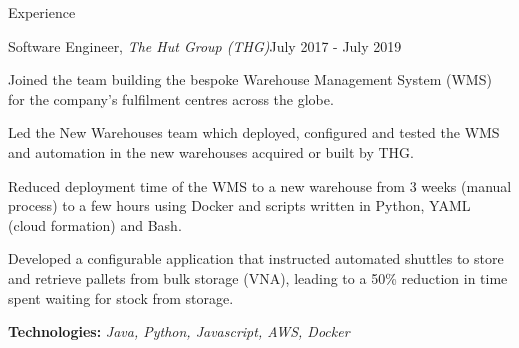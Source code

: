 \documentclass{resume}
\begin{document}
\begin{rSection}{Experience}
    \begin{rSubsection}{Software Engineer, \textit{The Hut Group (THG)}}{July 2017 - July 2019}{}{}
        \item Joined the team building the bespoke Warehouse Management System (WMS) for the company's fulfilment centres across the globe.
        \item Led the New Warehouses team which deployed, configured and tested the WMS and automation in the new warehouses acquired or built by THG.
        \item Reduced deployment time of the WMS to a new warehouse from 3 weeks (manual process) to a few hours using Docker and scripts written in Python, YAML (cloud formation) and Bash.
        \item Developed a configurable application that instructed automated shuttles to store and retrieve pallets from bulk storage (VNA), leading to a 50\% reduction in time spent waiting for stock from storage.
        \item \textbf{Technologies:} \textit{Java, Python, Javascript, AWS, Docker}
    \end{rSubsection}

\end{rSection}

\newpage
\end{document}
